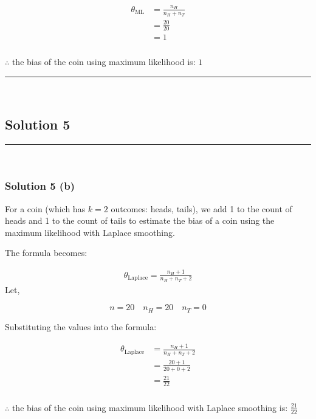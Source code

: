\documentclass{article}
\begin{document}
\begin{align*}
    \theta_{\text{ML}} &= \frac{n_H}{n_H + n_T} \\
    &= \frac{20}{20} \\
    &= 1
\end{align*}

\subsubsection*{\normalfont}{$\therefore$ the bias of the coin using maximum likelihood is: $1$}

\noindent\rule{\textwidth}{0.4pt}\\

\newpage

\subsection*{Solution 5}
\noindent\rule{\textwidth}{0.4pt}\\

\subsubsection*{Solution 5 (b)}
For a coin (which has $k=2$ outcomes: heads, tails), we add 1 to the count of heads and 1 to the count of tails to estimate the bias of a coin using the maximum likelihood with Laplace smoothing.

\begin{flushleft}
    The formula becomes:
\end{flushleft}

\begin{align*}
    \theta_{\text{Laplace}} = \frac{n_H + 1}{n_H + n_T + 2} 
\end{align*}
Let,

$$n = 20 \quad n_H = 20 \quad n_T = 0$$

\begin{flushleft}
    Substituting the values into the formula:
\end{flushleft}

\begin{align*}
    \theta_{\text{Laplace}} &= \frac{n_H + 1}{n_H + n_T + 2} \\
    &= \frac{20 + 1}{20 + 0 + 2} \\
    &= \frac{21}{22}
\end{align*}

\subsubsection*{\normalfont}{$\therefore$ the bias of the coin using maximum likelihood with Laplace smoothing is: $\frac{21}{22}$} \\
\end{document}
